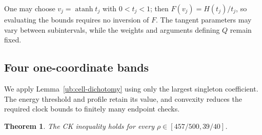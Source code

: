 \documentclass[11pt,letterpaper]{amsart}
\newcommand{\1}{\mathbf 1}
\DeclareMathOperator{\atanh}{atanh}
\newtheorem{theorem}{Theorem}[section]
\numberwithin{equation}{section}
\begin{document}
One may choose $v_j=\atanh t_j$ with $0<t_j<1$;
then $F(v_j)=H(t_j)/t_j$, so evaluating the bounds requires
no inversion of $F$.
The tangent parameters may vary between subintervals,
while the weights and arguments defining $Q$ remain fixed.

\subsection{Four one-coordinate bands}

We apply Lemma~\ref{ub:cell-dichotomy} using only the largest
singleton coefficient. The energy threshold and profile retain
its value, and convexity reduces the required clock bounds to
finitely many endpoint checks.

\begin{theorem}\label{ub:upper-middle}
The CK inequality holds for every
$\rho\in[457/500,39/40]$.
\end{theorem}
\end{document}
